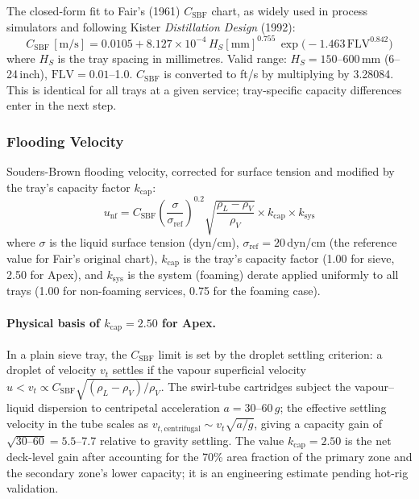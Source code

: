 \documentclass[11pt,letterpaper]{article}
\newcommand{\Csb}{C_{\mathrm{SBF}}}
\newcommand{\FLV}{\mathrm{FLV}}
\newcommand{\unf}{u_{\mathrm{nf}}}
\begin{document}
The closed-form fit to Fair's (1961) $\Csb$ chart, as widely used in
process simulators and following Kister \textit{Distillation Design} (1992):
\begin{equation}
  \Csb\,[\mathrm{m/s}] = 0.0105 + 8.127\times10^{-4}\,
  H_S[\mathrm{mm}]^{0.755}\,
  \exp\!\bigl(-1.463\,\FLV^{0.842}\bigr)
  \label{eq:csbf}
\end{equation}
where $H_S$ is the tray spacing in millimetres.  Valid range:
$H_S = 150$--600\,mm (6--24\,inch), $\FLV = 0.01$--1.0.  $\Csb$ is converted
to ft/s by multiplying by 3.28084.  This is identical for all trays at a
given service; tray-specific capacity differences enter in the next step.

\subsubsection{Flooding Velocity}
\label{sec:unf}

Souders-Brown flooding velocity, corrected for surface tension and modified
by the tray's capacity factor $k_{\mathrm{cap}}$:
\begin{equation}
  \unf = \Csb\left(\frac{\sigma}{\sigma_{\mathrm{ref}}}\right)^{0.2}
         \sqrt{\frac{\rho_L-\rho_V}{\rho_V}}
         \times k_{\mathrm{cap}} \times k_{\mathrm{sys}}
  \label{eq:unf}
\end{equation}
where $\sigma$ is the liquid surface tension (dyn/cm), $\sigma_{\mathrm{ref}}
= 20$\,dyn/cm (the reference value for Fair's original chart), $k_{\mathrm{cap}}$
is the tray's capacity factor (1.00 for sieve, 2.50 for Apex), and $k_{\mathrm{sys}}$
is the system (foaming) derate applied uniformly to all trays (1.00 for
non-foaming services, 0.75 for the foaming case).

\paragraph{Physical basis of $k_{\mathrm{cap}} = 2.50$ for Apex.}
In a plain sieve tray, the $\Csb$ limit is set by the droplet settling
criterion: a droplet of velocity $v_t$ settles if the vapour superficial
velocity $u < v_t \propto \Csb\sqrt{(\rho_L-\rho_V)/\rho_V}$.  The swirl-tube
cartridges subject the vapour--liquid dispersion to centripetal acceleration
$a = 30$--60\,$g$; the effective settling velocity in the tube scales as
$v_{t,\mathrm{centrifugal}} \sim v_t\sqrt{a/g}$, giving a capacity gain
of $\sqrt{30\text{--}60} = 5.5$--7.7 relative to gravity settling.  The
value $k_{\mathrm{cap}}=2.50$ is the net deck-level gain after accounting for
the 70\% area fraction of the primary zone and the secondary zone's lower
capacity; it is an engineering estimate pending hot-rig validation.
\end{document}
